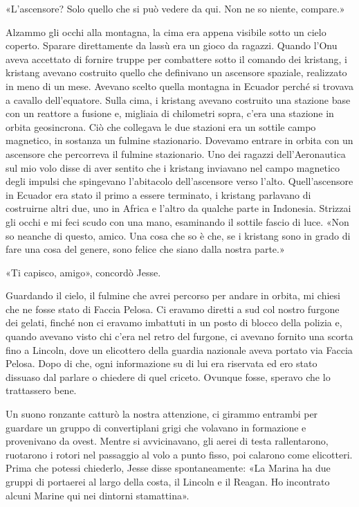 «L'ascensore? Solo quello che si può vedere da qui. Non ne so niente,
compare.»

Alzammo gli occhi alla montagna, la cima era appena visibile sotto un
cielo coperto. Sparare direttamente da lassù era un gioco da ragazzi.
Quando l'Onu aveva accettato di fornire truppe per combattere sotto il
comando dei kristang, i kristang avevano costruito quello che definivano
un ascensore spaziale, realizzato in meno di un mese. Avevano scelto
quella montagna in Ecuador perché si trovava a cavallo dell'equatore.
Sulla cima, i kristang avevano costruito una stazione base con un
reattore a fusione e, migliaia di chilometri sopra, c'era una stazione
in orbita geosincrona. Ciò che collegava le due stazioni era un sottile
campo magnetico, in sostanza un fulmine stazionario. Dovevamo entrare in
orbita con un ascensore che percorreva il fulmine stazionario. Uno dei
ragazzi dell'Aeronautica sul mio volo disse di aver sentito che i
kristang inviavano nel campo magnetico degli impulsi che spingevano
l'abitacolo dell'ascensore verso l'alto. Quell'ascensore in Ecuador era
stato il primo a essere terminato, i kristang parlavano di costruirne
altri due, uno in Africa e l'altro da qualche parte in Indonesia.
Strizzai gli occhi e mi feci scudo con una mano, esaminando il sottile
fascio di luce. «Non so neanche di questo, amico. Una cosa che so è che,
se i kristang sono in grado di fare una cosa del genere, sono felice che
siano dalla nostra parte.»

«Ti capisco, amigo», concordò Jesse.

Guardando il cielo, il fulmine che avrei percorso per andare in orbita,
mi chiesi che ne fosse stato di Faccia Pelosa. Ci eravamo diretti a sud
col nostro furgone dei gelati, finché non ci eravamo imbattuti in un
posto di blocco della polizia e, quando avevano visto chi c'era nel
retro del furgone, ci avevano fornito una scorta fino a Lincoln, dove un
elicottero della guardia nazionale aveva portato via Faccia Pelosa. Dopo
di che, ogni informazione su di lui era riservata ed ero stato dissuaso
dal parlare o chiedere di quel criceto. Ovunque fosse, speravo che lo
trattassero bene.

Un suono ronzante catturò la nostra attenzione, ci girammo entrambi per
guardare un gruppo di convertiplani grigi che volavano in formazione e
provenivano da ovest. Mentre si avvicinavano, gli aerei di testa
rallentarono, ruotarono i rotori nel passaggio al volo a punto fisso,
poi calarono come elicotteri. Prima che potessi chiederlo, Jesse disse
spontaneamente: «La Marina ha due gruppi di portaerei al largo della
costa, il Lincoln e il Reagan. Ho incontrato alcuni Marine qui nei
dintorni stamattina».


